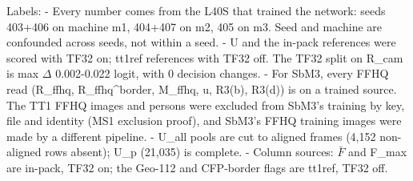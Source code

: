 \documentclass[10pt,twocolumn,letterpaper]{article}
\begin{document}
Labels: - Every number comes from the L40S that trained the network: seeds 403+406 on machine m1, 404+407 on m2, 405 on m3. Seed and machine are confounded across seeds, not within a seed. - U and the in-pack references were scored with TF32 on; tt1ref references with TF32 off. The TF32 split on R\_cam is max \textbar{}\(\Delta\)\textbar{} 0.002-0.022 logit, with 0 decision changes. - For SbM3, every FFHQ read (R\_ffhq, R\_ffhq\^{}border, M\_ffhq, u, R3(b), R3(d)) is on a trained source. The TT1 FFHQ images and persons were excluded from SbM3's training by key, file and identity (MS1 exclusion proof), and SbM3's FFHQ training images were made by a different pipeline. - U\_all pools are cut to aligned frames (4,152 non-aligned rows absent); U\_p (21,035) is complete. - Column sources: \(\bar F\) and F\_max are in-pack, TF32 on; the Geo-112 and CFP-border flags are tt1ref, TF32 off.
\end{document}
